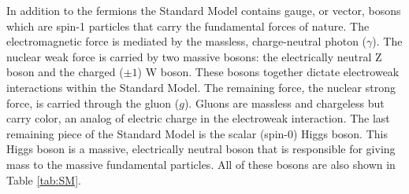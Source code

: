 In addition to the fermions the Standard Model contains gauge, or vector, bosons which are spin-1 particles that carry the fundamental forces of nature.  The electromagnetic force is mediated by the massless, charge-neutral photon ($\gamma$). The nuclear weak force is carried by two massive bosons: the electrically neutral Z boson and the charged ($\pm 1$) W boson.  These bosons together dictate electroweak interactions within the Standard Model.  The remaining force, the nuclear strong force, is carried through the gluon ($g$).  Gluons are massless and chargeless but carry color, an analog of electric charge in the electroweak interaction.  The last remaining piece of the Standard Model is the scalar (spin-0) Higgs boson.  This Higgs boson is a massive, electrically neutral boson that is responsible for giving mass to the massive fundamental particles.  All of these bosons are also shown in Table \ref{tab:SM}.  

